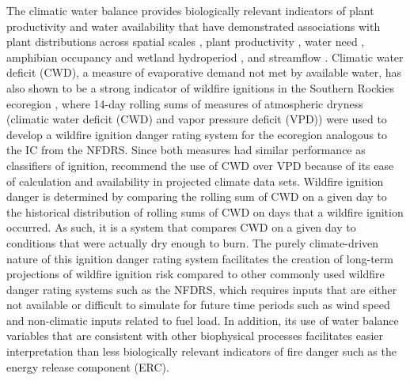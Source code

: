 \documentclass[11p]{article}
\begin{document}
The climatic water balance provides biologically relevant indicators of plant productivity and water availability that have demonstrated associations with plant distributions across spatial scales \citep{stephensonActualEvapotranspirationDeficit1998,stephensonClimaticControlVegetation1990}, plant productivity \citep{thomaSemiaridVegetationResponse2016,thomaWaterBalanceIndicator2020}, water need \citep{thomaLandscapePivotPoints2019}, amphibian occupancy and wetland hydroperiod \citep{rayMultispeciesAmphibianMonitoring2022,lafranceAmphibianRichnessRarity2024}, and streamflow \citep{thomaWaterBalanceIndicator2020}. Climatic water deficit (CWD), a measure of evaporative demand not met by available water, has also shown to be a strong indicator of wildfire ignitions in the Southern Rockies ecoregion \citep{omernikEcoregionsConterminousUnited1987}, where 14-day rolling sums of measures of atmospheric dryness (climatic water deficit (CWD) and vapor pressure deficit (VPD)) were used to develop a wildfire ignition danger rating system for the ecoregion \citep{thomaWaterBalanceIndicator2020} analogous to the IC from the NFDRS. Since both measures had similar performance as classifiers of ignition, \citet{thomaWaterBalanceIndicator2020} recommend the use of CWD over VPD because of its ease of calculation and availability in projected climate data sets. Wildfire ignition danger is determined by comparing the rolling sum of CWD on a given day to the historical distribution of rolling sums of CWD on days that a wildfire ignition occurred. As such, it is a system that compares CWD on a given day to conditions that were actually dry enough to burn. The purely climate-driven nature of this ignition danger rating system facilitates the creation of long-term projections of wildfire ignition risk compared to other commonly used wildfire danger rating systems such as the NFDRS, which requires inputs that are either not available or difficult to simulate for future time periods such as wind speed and non-climatic inputs related to fuel load. In addition, its use of water balance variables that are consistent with other biophysical processes facilitates easier interpretation than less biologically relevant indicators of fire danger such as the energy release component (ERC).
\end{document}
